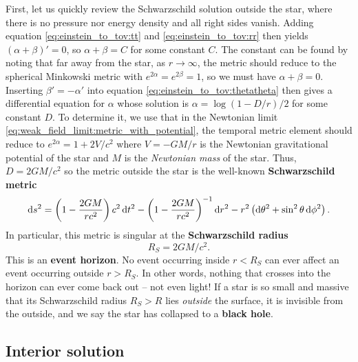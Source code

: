 First, let us quickly review the Schwarzschild solution outside the star, where there is no pressure nor energy density and all right sides vanish.
Adding equation \eqref{eq:einstein_to_tov:tt} and \eqref{eq:einstein_to_tov:rr} then yields $(\alpha + \beta)' = 0$, so $\alpha + \beta = C$ for some constant $C$.
The constant can be found by noting that far away from the star, as $r \rightarrow \infty$, the metric should reduce to the spherical Minkowski metric with $e^{2\alpha} = e^{2 \beta} = 1$, so we must have $\alpha + \beta = 0$.
Inserting $\beta' = -\alpha'$ into equation \eqref{eq:einstein_to_tov:thetatheta} then gives a differential equation for $\alpha$ whose solution is $\alpha = \log \left( 1 - D / r \right) / 2$ for some constant $D$.
To determine it, we use that in the Newtonian limit \eqref{eq:weak_field_limit:metric_with_potential}, the temporal metric element should reduce to $e^{2 \alpha} = 1 + 2 V / c^2$ where $V = - G M / r$ is the Newtonian gravitational potential of the star and $M$ is the \emph{Newtonian mass} of the star.
Thus, $D = 2 G M / c^2$ so the metric outside the star is the well-known \textbf{Schwarzschild metric}
\begin{equation}
	\mathop{}\!\mathrm{d} s^2 = \left( 1 - \frac{2 G M}{r c^2} \right) c^2 \mathop{}\!\mathrm{d} t^2 - \left( 1 - \frac{2 G M}{r c^2} \right)^{-1} \mathop{}\!\mathrm{d} r^2 - r^2 \left( \mathop{}\!\mathrm{d} \theta^2 + \sin^2 \theta \mathop{}\!\mathrm{d} \phi^2 \right) .
\label{eq:tov:schwarzschild_metric}
\end{equation}
In particular, this metric is singular at the \textbf{Schwarzschild radius}
\begin{equation}
	R_S = 2 G M / c^2.
\label{eq:tov:schwarzschild_radius}
\end{equation}
This is an \textbf{event horizon}.
No event occurring inside $r < R_S$ can ever affect an event occurring outside $r > R_S$. \cite[section 5.6]{ref:carroll}
In other words, nothing that crosses into the horizon can ever come back out -- not even light!
If a star is so small and massive that its Schwarzschild radius $R_S > R$ lies \emph{outside} the surface, it is invisible from the outside, and we say the star has collapsed to a \textbf{black hole}.

\subsection*{Interior solution}

